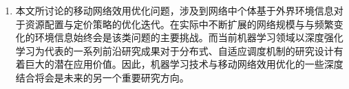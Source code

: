 \begin{enumerate}
    \item 本文所讨论的移动网络效用优化问题，涉及到网络中个体基于外界环境信息对于资源配置与定价策略的优化迭代。在实际中不断扩展的网络规模与与频繁变化的环境信息始终会是该类问题的主要挑战。而当前机器学习领域以深度强化学习为代表的一系列前沿研究成果对于分布式、自适应调度机制的研究设计有着巨大的潜在应用价值。因此，机器学习技术与移动网络效用优化的一些深度结合将会是未来的另一个重要研究方向。
\end{enumerate}







